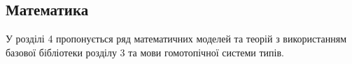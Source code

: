 \subsection*{Математика}

У розділі 4 пропонується ряд математичних моделей та теорій з використанням
базової бібліотеки розділу 3 та мови гомотопічної системи типів.



